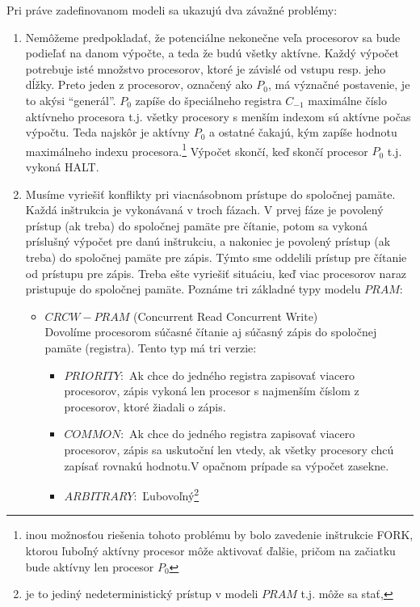 Pri práve zadefinovanom modeli sa ukazujú dva závažné problémy:
\begin{enumerate}
  \item Nemôžeme predpokladať, že potenciálne nekonečne veľa
  procesorov sa bude podieľať na danom výpočte, a teda že budú
  všetky aktívne. Každý výpočet potrebuje isté množstvo
  procesorov, ktoré je závislé od vstupu resp. jeho dĺžky. Preto
  jeden z procesorov, označený ako $P_0$, má význačné postavenie,
  je to akýsi ``generál''. $P_0$ zapíše do špeciálneho registra $C_{-1}$
  maximálne číslo aktívneho procesora t.j. všetky procesory s
  menším indexom sú aktívne počas výpočtu. Teda najskôr je aktívny
  $P_0$ a ostatné čakajú, kým zapíše hodnotu maximálneho indexu
  procesora.\footnote{inou možnosťou riešenia tohoto problému by
  bolo zavedenie inštrukcie FORK, ktorou ľuboľný aktívny procesor môže
  aktivovať ďalšie, pričom na začiatku bude aktívny len procesor
  $P_0$}
  Výpočet skončí, keď skončí procesor $P_0$ t.j. vykoná HALT.
  \item Musíme vyriešiť konflikty pri viacnásobnom prístupe do
  spoločnej pamäte. Každá inštrukcia je vykonávaná v troch fázach.
  V prvej fáze je povolený prístup (ak treba) do spoločnej pamäte
  pre čítanie, potom sa vykoná príslušný výpočet pre danú
  inštrukciu, a nakoniec je povolený prístup (ak treba) do
  spoločnej pamäte pre zápis. Týmto sme oddelili prístup pre
  čítanie od prístupu pre zápis. Treba ešte vyriešiť situáciu, keď
  viac procesorov naraz pristupuje do spoločnej pamäte. Poznáme
  tri základné typy modelu $PRAM$:
  \begin{itemize}
    \item $CRCW-PRAM$ (Concurrent Read Concurrent Write) \\ Dovolíme
    procesorom súčasné čítanie aj súčasný zápis do spoločnej
    pamäte (registra). Tento typ má tri verzie:
    \begin{itemize}
      \item $PRIORITY:$ Ak chce do jedného registra zapisovať
      viacero procesorov, zápis vykoná len procesor s najmenším
      číslom z procesorov, ktoré žiadali o zápis.
      \item $COMMON:$ Ak chce do jedného registra zapisovať viacero
      procesorov, zápis sa uskutoční len vtedy, ak všetky
      procesory chcú zapísať rovnakú hodnotu.\newline V opačnom prípade sa
      výpočet zasekne.
      \item $ARBITRARY:$ Ľubovoľný\footnote{je to jediný
      nedeterministický prístup v modeli $PRAM$ t.j. môže sa stať,
}
\end{itemize}
\end{itemize}
\end{enumerate}
